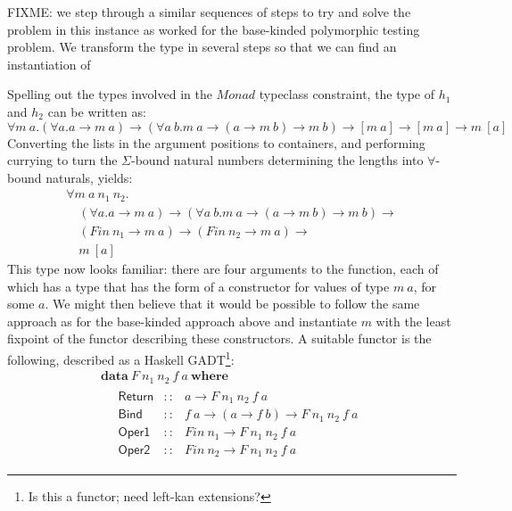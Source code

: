\documentclass{llncs}
\begin{document}
FIXME: we step through a similar sequences of steps to try and solve
the problem in this instance as worked for the base-kinded polymorphic
testing problem. We transform the type in several steps so that we can
find an instantiation of 

Spelling out the types involved in the $\mathit{Monad}$ typeclass
constraint, the type of $h_1$ and $h_2$ can be written as:
\begin{displaymath}
  \forall m~a.
  (\forall a. a \to m~a) \to
  (\forall a~b. m~a \to (a \to m~b) \to m~b) \to
  [m~a] \to
  [m~a] \to
  m~[a]
\end{displaymath}
Converting the lists in the argument positions to containers, and
performing currying to turn the $\Sigma$-bound natural numbers
determining the lengths into $\forall$-bound naturals, yields:
\begin{displaymath}
  \begin{array}{l}
    \forall m~a~n_1~n_2. \\
    \quad (\forall a. a \to m~a) \to (\forall a~b. m~a \to (a \to m~b) \to m~b) \to \\
    \quad (\mathit{Fin}~n_1 \to m~a) \to (\mathit{Fin}~n_2 \to m~a) \to \\
    \quad m~[a]
  \end{array}
\end{displaymath}
This type now looks familiar: there are four arguments to the
function, each of which has a type that has the form of a constructor
for values of type $m~a$, for some $a$. We might then believe that it
would be possible to follow the same approach as for the base-kinded
approach above and instantiate $m$ with the least fixpoint of the
functor describing these constructors. A suitable functor is the
following, described as a Haskell GADT\footnote{Is this a functor;
  need left-kan extensions?}:
\begin{displaymath}
  \begin{array}{l}
    \mathbf{data}~F~n_1~n_2~f~a~\mathbf{where} \\
    \quad
    \begin{array}{lcl}
      \mathsf{Return}&::&a \to F~n_1~n_2~f~a \\
      \mathsf{Bind}  &::&f~a \to (a \to f~b) \to F~n_1~n_2~f~a \\
      \mathsf{Oper1} &::&\mathit{Fin}~n_1 \to F~n_1~n_2~f~a \\
      \mathsf{Oper2} &::&\mathit{Fin}~n_2 \to F~n_1~n_2~f~a
    \end{array}
  \end{array}
\end{displaymath}
\end{document}

